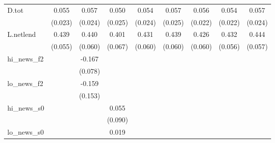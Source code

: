 {\begin{tabular}{l*{8}{c}}
D.tot       &       0.055\sym{**} &       0.057\sym{**} &       0.050\sym{*}  &       0.054\sym{**} &       0.057\sym{**} &       0.056\sym{**} &       0.054\sym{**} &       0.057\sym{**} \\
            &     (0.023)         &     (0.024)         &     (0.025)         &     (0.024)         &     (0.025)         &     (0.022)         &     (0.022)         &     (0.024)         \\
\addlinespace
L.netlend   &       0.439\sym{***}&       0.440\sym{***}&       0.401\sym{***}&       0.431\sym{***}&       0.439\sym{***}&       0.426\sym{***}&       0.432\sym{***}&       0.444\sym{***}\\
            &     (0.055)         &     (0.060)         &     (0.067)         &     (0.060)         &     (0.060)         &     (0.060)         &     (0.056)         &     (0.057)         \\
\addlinespace
hi\_news\_f2  &                     &      -0.167\sym{**} &                     &                     &                     &                     &                     &                     \\
            &                     &     (0.078)         &                     &                     &                     &                     &                     &                     \\
\addlinespace
lo\_news\_f2  &                     &      -0.159         &                     &                     &                     &                     &                     &                     \\
            &                     &     (0.153)         &                     &                     &                     &                     &                     &                     \\
\addlinespace
hi\_news\_s0  &                     &                     &       0.055         &                     &                     &                     &                     &                     \\
            &                     &                     &     (0.090)         &                     &                     &                     &                     &                     \\
\addlinespace
lo\_news\_s0  &                     &                     &       0.019         &                     &                     &                     &                     &                     \\

\end{tabular}}
